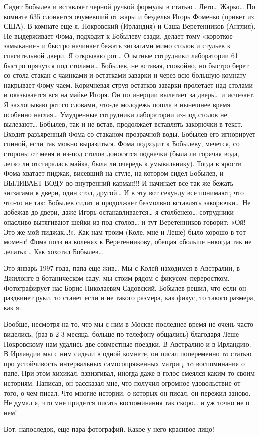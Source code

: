 Сидит Бобылев и вставляет черной ручкой формулы в статью . Лето… Жарко… По комнате 635 слоняется очумевший от жары и безделья Игорь Фоменко (привет из США). В комнате еще я, Покровский (Ирландия) и Саша Веретенников (Англия). Не выдерживает Фома, подходит к Бобылеву сзади, делает тому «короткое замыкание» и быстро начинает бежать зигзагами мимо столов и стульев к спасительной двери. Я открываю рот… Опытные сотрудники лаборатории 61 быстро прячутся под столами… Бобылев, не вставая, спокойно, но быстро берет со стола стакан с чаинками и остатками заварки и через всю большую комнату накрывает Фому чаем. Коричневая струя остатков заварки пролетает над столами и оказывается вся на майке Игоря. Он по инерции вылетает за дверь… и исчезает. Я захлопываю рот со словами, что-де молодежь пошла в нынешнее время особенно наглая… Умудренные сотрудники лаборатории из-под столов не вылезают… Бобылев, так и не встав, продолжает вставлять закорючки в текст. Входит разъяренный Фома со стаканом прозрачной воды. Бобылев его игнорирует спиной, если так можно выразиться. Фома подходит к Бобылеву, мечется, со стороны от меня и из-под столов доносятся подначки (была ли горячая вода, легко ли отстиралась майка, была ли очередь к умывальнику). Тогда в ярости Фома хватает пиджак, висевший на стуле, на котором сидел Бобылев, и ВЫЛИВАЕТ ВОДУ во внутренний карман!!! И начинает все так же бежать зигзагами к двери, один стол, другой… И в эту вот секунду все понимают, что что-то не так: Бобылев сидит и продолжает безмолвно вставлять закорючки… Не добежав до двери, даже Игорь останавливается… я столбенею… сотрудники опасливо вытягивают шейки из-под столов… и тут Веретенников говорит: «Ой! Это же мой пиджак…!». Как нам троим (Коле, мне и Леше) было хорошо в тот момент! Фома полз на коленях к Веретенникову, обещая «больше никогда так не делать»… Как хохотал Бобылев…

Это январь 1997 года, папа еще жив… Мы с Колей находимся в Австралии, в Джилонге в ботаническом саду, мы стоим рядом с фикусом–переростком. Фотографирует нас Борис Николаевич Садовский. Бобылев решил, что если он раздвинет руки, то станет если и не такого размера, как фикус, то такого размера, как я.

Вообще, несмотря на то, что мы с ним в Москве последнее время не очень часто виделись, (раз в 2-3 месяца, больше по телефону общались) благодаря Леше Покровскому нам удались две совместные поездки. В Австралию и в Ирландию. В Ирландии мы с ним сидели в одной комнате, он писал попеременно тo статью про устойчивость интервальных самосопряженных матриц, тo воспоминания о папе. При этом хихикал, взвизгивал, иногда даже в голос смеялся каким-то своим историям. Написав, он рассказал мне, что получил огромное удовольствие от того, о чем писал. Что многие истории, о которых он писал, он пережил заново. Не думал я, что мне придется писать воспоминания так скоро… и уж точно не о нем!
 	
Вот, напоследок, еще пара фотографий. Какое у него красивое лицо!

